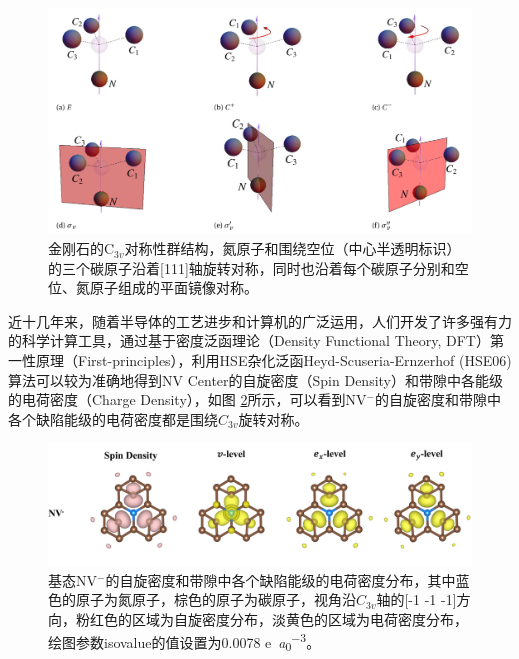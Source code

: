 \documentclass[type = bachelor, oneside]{whu-thesis}
\begin{document}
\begin{figure}
  \centering
  \includegraphics[width=1.0\textwidth]{figures/Chapter 2/NV Symmetry.png}
  \caption[金刚石的C$_{3v}$对称性群结构]{金刚石的C$_{3v}$对称性群结构，氮原子和围绕空位（中心半透明标识）的三个碳原子沿着[111]轴旋转对称，同时也沿着每个碳原子分别和空位、氮原子组成的平面镜像对称\cite{Doherty2013}。}
  \label{fig: NV Symmetry}
\end{figure}

近十几年来，随着半导体的工艺进步和计算机的广泛运用，人们开发了许多强有力的科学计算工具，通过基于密度泛函理论（Density Functional Theory, DFT）第一性原理（First-principles），利用HSE杂化泛函Heyd-Scuseria-Ernzerhof (HSE06)算法可以较为准确地得到NV Center的自旋密度（Spin Density）和带隙中各能级的电荷密度（Charge Density），如图 \ref{fig: Spin and Charge Density}所示，可以看到NV$^-$的自旋密度和带隙中各个缺陷能级的电荷密度都是围绕$C_{3v}$旋转对称\cite{Zou2024}。

\begin{figure}
  \centering
  \includegraphics[width=1.0\textwidth]{figures/Chapter 2/Spin and Charge Density.png}
  \caption[基态NV$^-$的自旋密度和带隙中各个缺陷能级的电荷密度分布]{基态NV$^-$的自旋密度和带隙中各个缺陷能级的电荷密度分布，其中蓝色的原子为氮原子，棕色的原子为碳原子，视角沿$C_{3v}$轴的[-1 -1 -1]方向，粉红色的区域为自旋密度分布，淡黄色的区域为电荷密度分布，绘图参数isovalue的值设置为0.0078 \unit{e\per\bohr\cubed}\cite{Zou2024}。}
  \label{fig: Spin and Charge Density}
\end{figure}
\end{document}
